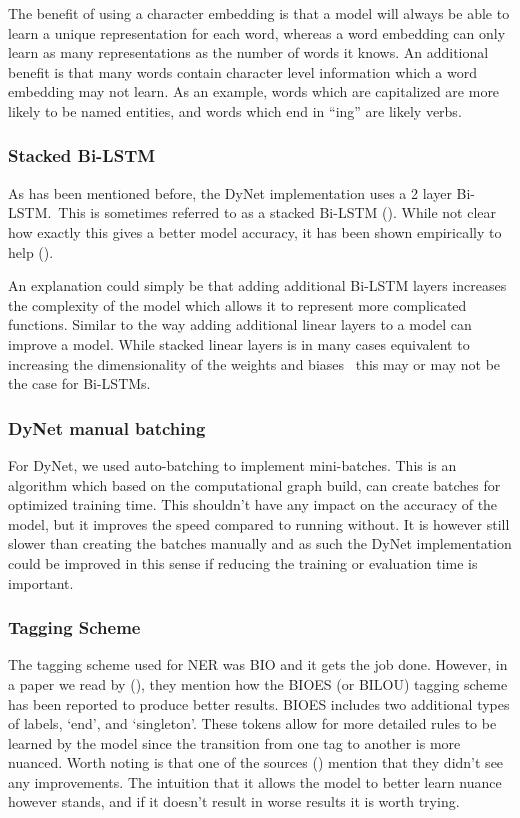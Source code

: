 The benefit of using a character embedding is that a model will always be able
to learn a unique representation for each word, whereas a word embedding can
only learn as many representations as the number of words it knows. An
additional benefit is that many words contain character level information which
a word embedding may not learn. As an example, words which are capitalized are
more likely to be named entities, and words which end in ``ing'' are likely
verbs.

\subsubsection{Stacked Bi-LSTM}

As has been mentioned before, the DyNet implementation uses a 2 layer Bi-LSTM.\
This is sometimes referred to as a stacked
Bi-LSTM (\cite[Chapter~14.5]{goldberg2017neural}). While not clear how exactly
this gives a better model accuracy, it has been shown empirically to
help (\cite{reimers2017reporting}).

An explanation could simply be that adding additional Bi-LSTM layers increases
the complexity of the model which allows it to represent more complicated
functions. Similar to the way adding additional linear layers to a model can
improve a model. While stacked linear layers is in many cases equivalent to
increasing the dimensionality of the weights and
biases~\cite[pp.~199]{goodfellow2016deep} this may or may not be the case for
Bi-LSTMs.

\subsubsection{DyNet manual batching}

For DyNet, we used auto-batching to implement mini-batches. This is an algorithm
which based on the computational graph build, can create batches for optimized
training time. This shouldn't have any impact on the accuracy of the model, but
it improves the speed compared to running without. It is however still slower
than creating the batches manually and as such the DyNet implementation could be
improved in this sense if reducing the training or evaluation time is important.

\subsubsection{Tagging Scheme}

The tagging scheme used for NER was BIO and it gets the job done. However, in a
paper we read by (\cite{ma2016endtoend}), they mention how the BIOES (or BILOU)
tagging scheme has been reported to produce better results. BIOES includes two
additional types of labels, `end', and `singleton'. These tokens allow for more
detailed rules to be learned by the model since the transition from one tag to
another is more nuanced. Worth noting is that one of the sources
(\cite{lample2016neural}) mention that they didn't see any improvements. The
intuition that it allows the model to better learn nuance however stands, and if
it doesn't result in worse results it is worth trying.

